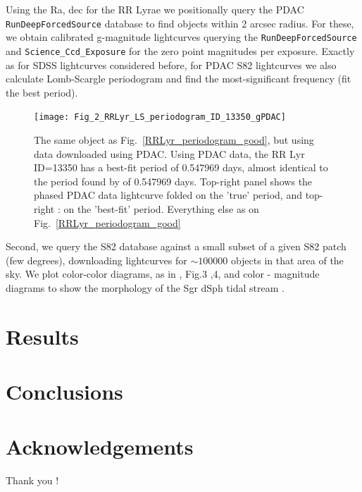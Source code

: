\documentclass[fleqn,usenatbib]{mnras} %
\begin{document}
Using the Ra, dec for the RR Lyrae we positionally query the PDAC  \verb|RunDeepForcedSource| database to find objects within 2 arcsec radius. For these, we obtain calibrated g-magnitude lightcurves querying the \verb|RunDeepForcedSource| and \verb|Science_Ccd_Exposure| for the zero point magnitudes per exposure. Exactly as for \cite{sesar2010} SDSS lightcurves considered before, for PDAC S82 lightcurves we also calculate Lomb-Scargle periodogram and find the most-significant frequency (fit the best period). 



\begin{figure}
\texttt{[image: Fig\_2\_RRLyr\_LS\_periodogram\_ID\_13350\_gPDAC]}
\caption{ The same object as Fig.~\ref{RRLyr_periodogram_good}, but using data downloaded using PDAC. Using PDAC data, the RR Lyr ID=13350 has a best-fit period of 0.547969 days, almost identical to the period found by \citep{sesar2010} of 0.547969 days. Top-right panel shows the phased PDAC data lightcurve folded on the 'true' period, and top-right : on the 'best-fit' period. Everything else as on Fig.~\ref{RRLyr_periodogram_good}}
\label{fig:RRLyr_periodogram_PDAC}
\end{figure}




Second, we query the S82 database against a small subset of a given S82 patch (few degrees), downloading lightcurves for $\sim100 000 $ objects in that area of the sky. We plot color-color diagrams, as in \cite{sesar2007}, Fig.3 ,4, and color - magnitude diagrams to show the morphology of the Sgr dSph tidal stream \citep{sesar2010}.  





\section{Results}

\section{Conclusions}

\section*{Acknowledgements}
Thank you ! 


\end{document}

